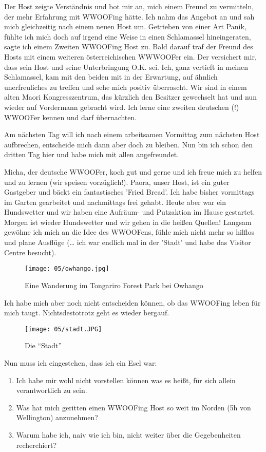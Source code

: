 Der Host zeigte Verständnis und bot mir an, mich einem Freund zu
vermitteln, der mehr Erfahrung mit WWOOFing hätte. Ich nahm das
Angebot an und sah mich gleichzeitig nach einem neuen Host
um. Getrieben von einer Art Panik, fühlte ich mich doch auf irgend
eine Weise in einen Schlamassel hineingeraten, sagte ich einem Zweiten
WWOOFing Host zu. Bald darauf traf der Freund des Hosts mit einem
weiteren österreichischen WWWOOFer ein. Der versichert mir, dass sein
Host und seine Unterbringung O.K. sei. Ich, ganz vertieft in meinen
Schlamassel, kam mit den beiden mit in der Erwartung, auf ähnlich
unerfreuliches zu treffen und sehe mich positiv überrascht. Wir sind
in einem alten Maori Kongresszentrum, das kürzlich den Besitzer
gewechselt hat und nun wieder auf Vordermann gebracht wird. Ich lerne
eine zweiten deutschen (!) WWOOFer kennen und darf übernachten.

Am nächsten Tag will ich nach einem arbeitsamen Vormittag zum nächsten
Host aufbrechen, entscheide mich dann aber doch zu bleiben. Nun bin
ich schon den dritten Tag hier und habe mich mit allen
angefreundet.

Micha, der deutsche WWOOFer, koch gut und gerne und ich
freue mich zu helfen und zu lernen (wir speisen vorzüglich!). Paora,
unser Host, ist ein guter Gastgeber und bäckt ein fantastisches 'Fried
Bread'. Ich habe bisher vormittags im Garten gearbeitet und
nachmittags frei gehabt. Heute aber war ein Hundswetter und wir haben
eine Aufräum- und Putzaktion im Hause gestartet. Morgen ist wieder
Hundswetter und wir gehen in die heißen Quellen! Langsam gewöhne ich
mich an die Idee des WWOOFens, fühle mich nicht mehr so hilflos und
plane Ausflüge (\ldots{} ich war endlich mal in der 'Stadt' und habe
das Visitor Centre besucht).
\begin{figure}[h]
  \centering
  \texttt{[image: 05/owhango.jpg]}
  \caption*{Eine Wanderung im Tongariro Forest Park bei Owhango}
\end{figure}

Ich habe mich aber noch nicht entscheiden
können, ob das WWOOFing leben für mich taugt.  Nichtsdestotrotz geht
es wieder bergauf.
\begin{figure}[h]
  \centering
  \texttt{[image: 05/stadt.JPG]}
  \caption*{Die ``Stadt''}
\end{figure}

Nun muss ich eingestehen, dass ich ein Esel war:

\begin{enumerate}
\tightlist
\item
  Ich habe mir wohl nicht vorstellen können was es heißt, für sich
  allein verantwortlich zu sein.
\item
  Was hat mich geritten einen WWOOFing Host so weit im Norden (5h von
  Wellington) anzunehmen?
\item
  Warum habe ich, naiv wie ich bin, nicht weiter über die Gegebenheiten
  recherchiert?
\end{enumerate}

